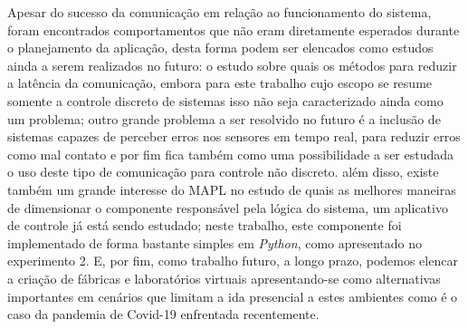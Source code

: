 Apesar do sucesso da comunicação em relação ao funcionamento do sistema, foram encontrados comportamentos que não eram diretamente
 esperados durante o planejamento da aplicação, desta forma podem ser elencados como estudos ainda a serem realizados no 
 futuro: o estudo sobre quais os métodos para reduzir a latência da comunicação, embora para este trabalho cujo escopo se
 resume somente a controle discreto de sistemas isso não seja caracterizado ainda como um problema; outro grande problema
 a ser resolvido no futuro é a inclusão de sistemas capazes de perceber erros nos sensores em tempo real, para reduzir 
 erros como mal contato e por fim fica também como uma possibilidade a ser estudada o uso deste tipo de comunicação para 
 controle não discreto. além disso, existe também um grande interesse do \ac{MAPL} no estudo de quais as melhores maneiras 
 de dimensionar o componente responsável pela lógica do sistema, um aplicativo de controle já está sendo estudado; neste
 trabalho, este componente foi implementado de forma bastante simples em \textit{Python}, como apresentado no experimento 2. E,
 por fim, como trabalho futuro, a longo prazo, podemos elencar a criação de fábricas e laboratórios virtuais apresentando-se
 como alternativas importantes em cenários que limitam a ida presencial a estes ambientes como é o caso da pandemia de Covid-19 enfrentada
 recentemente.